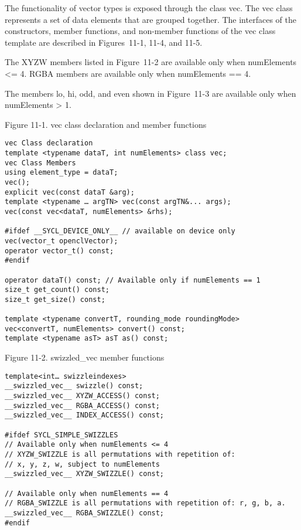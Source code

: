 The functionality of vector types is exposed through the class vec. The vec class represents a set of data elements that are grouped together. The interfaces of the constructors, member functions, and non-member functions of the vec class template are described in Figures 11-1, 11-4, and 11-5.\par

The XYZW members listed in Figure 11-2 are available only when numElements <= 4. RGBA members are available only when numElements == 4.\par

The members lo, hi, odd, and even shown in Figure 11-3 are available only when numElements > 1.\par

\hspace*{\fill} \par %
Figure 11-1. vec class declaration and member functions
\begin{lstlisting}[caption={}]
vec Class declaration
template <typename dataT, int numElements> class vec; 
vec Class Members 
using element_type = dataT; 
vec(); 
explicit vec(const dataT &arg); 
template <typename … argTN> vec(const argTN&... args); 
vec(const vec<dataT, numElements> &rhs); 

#ifdef __SYCL_DEVICE_ONLY__ // available on device only
vec(vector_t openclVector); 
operator vector_t() const; 
#endif

operator dataT() const; // Available only if numElements == 1 
size_t get_count() const; 
size_t get_size() const;

template <typename convertT, rounding_mode roundingMode> 
vec<convertT, numElements> convert() const; 
template <typename asT> asT as() const;
\end{lstlisting}

\hspace*{\fill} \par %
Figure 11-2. swizzled\_vec member functions
\begin{lstlisting}[caption={}]
template<int… swizzleindexes>
__swizzled_vec__ swizzle() const; 
__swizzled_vec__ XYZW_ACCESS() const; 
__swizzled_vec__ RGBA_ACCESS() const; 
__swizzled_vec__ INDEX_ACCESS() const; 

#ifdef SYCL_SIMPLE_SWIZZLES
// Available only when numElements <= 4 
// XYZW_SWIZZLE is all permutations with repetition of: 
// x, y, z, w, subject to numElements
__swizzled_vec__ XYZW_SWIZZLE() const;

// Available only when numElements == 4 
// RGBA_SWIZZLE is all permutations with repetition of: r, g, b, a. 
__swizzled_vec__ RGBA_SWIZZLE() const; 
#endif
\end{lstlisting}

